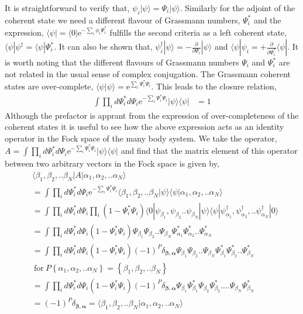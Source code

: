 \documentclass[notitlepage,onecolumn,showpacs,11pt]{revtex4-1}
\begin{document}
It is straightforward to verify that, $\psi_i|\psi\rangle=\Psi_i|\psi\rangle $. 
Similarly for the adjoint of the coherent state we need a different flavour of Grassmann 
numbers, $\Psi^*_i$  and the expression, 
$ \langle \psi|=\langle 0|\text{e}^{-\sum_i\phi_i\Psi^*_i}$ fulfills the
second criteria as a left coherent state, $\langle\psi|\psi^\dagger=\langle\psi|\Psi^*_i$.
It can also be shown that, $\psi^\dagger_i|\psi\rangle=-\frac{\partial}{\partial\Psi_i}|\psi\rangle$
and $\langle\psi|\psi_i=+\frac{\partial}{\partial\Psi^*_i}\langle\psi|$. It is worth noting that
the different flavours of Grassmann numbers $\Psi_i$ and $\Psi^*_i$ are not related in the
usual sense of complex conjugation. The Grassmann coherent states are over-complete, 
$ \langle\psi|\psi\rangle=\text{e}^{\sum_{i}\Psi^*_i\Psi_i} $. This leads to the closure relation,
\begin{equation}
	\begin{aligned}
		\int \prod_id\Psi^*_id\Psi_i\text{e}^{-\sum_i\Psi^*_i\Psi_i}|\psi\rangle\langle\psi|&=1
	\end{aligned}
\end{equation}
Although the prefactor is apprant from the expression of over-completeness of the coherent states
it is useful to see how the above expression acts as an identity operator in the Fock space of the
many body system. We take the operator, $ A=\int \prod_id\Psi^*_id\Psi_i
\text{e}^{-\sum_i\Psi^*_i\Psi_i}|\psi\rangle\langle\psi| $ 
and find that the matrix element of this operator between two arbitrary vectors in the 
Fock space is given by,
\begin{equation}
	\begin{aligned}
		&\langle \beta_1,\beta_2,..\beta_N|A|\alpha_1,\alpha_2,..\alpha_N\rangle \\
		&=\int \prod_id\Psi^*_id\Psi_i\text{e}^{-\sum_i\Psi^*_i\Psi_i}
		\langle \beta_1,\beta_2,..\beta_N|\psi\rangle
		\langle\psi|\alpha_1,\alpha_2,..\alpha_N\rangle \\
		&=\int \prod_id\Psi^*_id\Psi_i\prod_i\left(1-\Psi^*_i\Psi_i\right)
		\langle 0|\psi_{\beta_1},\psi_{\beta_2}..\psi_{\beta_N}|\psi\rangle
		\langle\psi|\psi^\dagger_{\alpha_1},\psi^\dagger_{\alpha_2},..\psi^\dagger_{\alpha_N}|0\rangle \\
		&=\int \prod_id\Psi^*_id\Psi_i\left(1-\Psi^*_i\Psi_i\right)
		\Psi_{\beta_1}\Psi_{\beta_2}..\Psi_{\beta_N}
		\Psi^*_{\alpha_1}\Psi^*_{\alpha_2}..\Psi^*_{\alpha_N} \\ 
		&=\int \prod_id\Psi^*_id\Psi_i\left(1-\Psi^*_i\Psi_i\right)(-1)^P\delta_{\bm{\beta},\bm{\alpha}}
		\Psi_{\beta_1}\Psi_{\beta_2}..\Psi_{\beta_N}
		\Psi^*_{\beta_1}\Psi^*_{\beta_2}..\Psi^*_{\beta_N} \\
		& \ \text{for} \ P \left\{\alpha_1,\alpha_2,..\alpha_N\right\}= \left\{\beta_1,\beta_2,..\beta_N\right\}\\
		&=\int \prod_id\Psi^*_id\Psi_i\left(1-\Psi^*_i\Psi_i\right)(-1)^P\delta_{\bm{\beta},\bm{\alpha}}
		\Psi_{\beta_1}\Psi^*_{\beta_1}
		\Psi_{\beta_2}\Psi^*_{\beta_2}....\Psi_{\beta_N}\Psi^*_{\beta_N} \\
		&=(-1)^P\delta_{\bm{\beta},\bm{\alpha}}=\langle \beta_1,\beta_2,..\beta_N|\alpha_1,\alpha_2,..\alpha_N\rangle 
	\end{aligned}
\end{equation}
\end{document}
